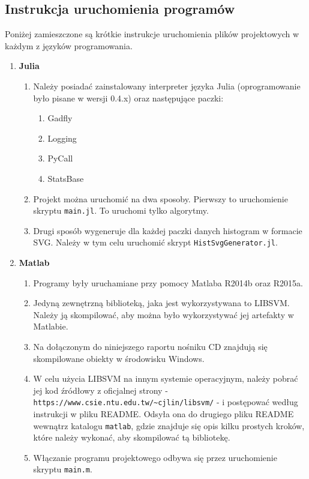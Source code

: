 \subsection{Instrukcja uruchomienia programów}
\label{sub:instrukcja}

\qquad Poniżej zamieszczone są krótkie instrukcje uruchomienia plików projektowych w każdym z języków programowania.
\begin{enumerate}
	\item \textbf{Julia}
	\begin{enumerate}
		\item Należy posiadać zainstalowany interpreter języka Julia (oprogramowanie było pisane w wersji 0.4.x) oraz następujące paczki:
		\begin{enumerate}
			\item Gadfly
			\item Logging
			\item PyCall
			\item StatsBase
		\end{enumerate}
		\item Projekt można uruchomić na dwa sposoby. Pierwszy to uruchomienie skryptu \texttt{main.jl}. To uruchomi tylko algorytmy.
		\item Drugi sposób wygeneruje dla każdej paczki danych histogram w formacie SVG. Należy w tym celu uruchomić skrypt \texttt{HistSvgGenerator.jl}.
	\end{enumerate}
	\item \textbf{Matlab}
	\begin{enumerate}
		\item Programy były uruchamiane przy pomocy Matlaba R2014b oraz R2015a.
		\item Jedyną zewnętrzną biblioteką, jaka jest wykorzystywana to LIBSVM. Należy ją skompilować, aby można było wykorzystywać jej artefakty w Matlabie.
		\item Na dołączonym do niniejszego raportu nośniku CD znajdują się skompilowane obiekty w środowisku Windows.
		\item W celu użycia LIBSVM na innym systemie operacyjnym, należy pobrać jej kod źródłowy z oficjalnej strony - \texttt{https://www.csie.ntu.edu.tw/\textasciitilde cjlin/libsvm/} - i postępować według instrukcji w pliku README. Odsyła ona do drugiego pliku README wewnątrz katalogu \texttt{matlab}, gdzie znajduje się opis kilku prostych kroków, które należy wykonać, aby skompilować tą bibliotekę.
		\item Włączanie programu projektowego odbywa się przez uruchomienie skryptu \texttt{main.m}.

\end{enumerate}
\end{enumerate}
